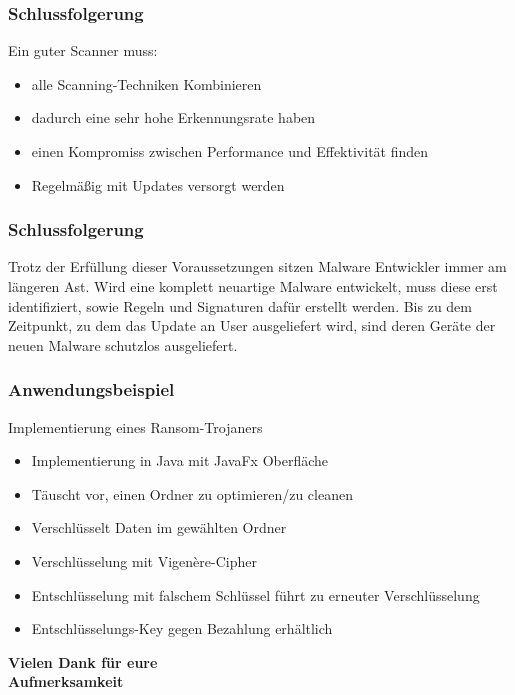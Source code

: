 \documentclass{beamer}
\begin{document}
\begin{frame}
	\frametitle{Schlussfolgerung}
	Ein guter Scanner muss:
	\begin{itemize}
		\item alle Scanning-Techniken Kombinieren
		\item dadurch eine sehr hohe Erkennungsrate haben
		\item einen Kompromiss zwischen Performance und Effektivität finden
		\item Regelmäßig mit Updates versorgt werden
	\end{itemize}
\end{frame}

\begin{frame}
	\frametitle{Schlussfolgerung}
	\begin{block}{}
		Trotz der Erfüllung dieser Voraussetzungen sitzen Malware Entwickler immer am längeren Ast. Wird eine komplett neuartige Malware entwickelt, muss diese erst identifiziert, sowie Regeln und Signaturen dafür erstellt werden. Bis zu dem Zeitpunkt, zu dem das Update an User ausgeliefert wird, sind deren Geräte der neuen Malware schutzlos ausgeliefert.
	\end{block}
\end{frame}

\begin{frame}
	\frametitle{Anwendungsbeispiel}
	Implementierung eines Ransom-Trojaners
	\begin{itemize}
		\item Implementierung in Java mit JavaFx Oberfläche
		\item Täuscht vor, einen Ordner zu optimieren/zu cleanen
		\item Verschlüsselt Daten im gewählten Ordner
		\item Verschlüsselung mit Vigenère-Cipher
		\item Entschlüsselung mit falschem Schlüssel führt zu erneuter Verschlüsselung
		\item Entschlüsselungs-Key gegen Bezahlung erhältlich
	\end{itemize}
	
\end{frame}

\begin{frame}
	\begin{center}
	\LARGE{\textbf{ Vielen Dank für eure \\Aufmerksamkeit}}
	\end{center}
\end{frame}
\end{document}
